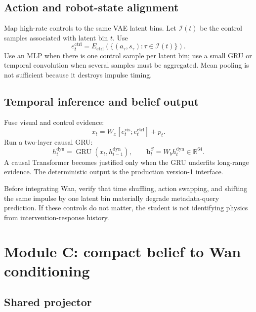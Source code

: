 \documentclass[11pt]{article}
\newcommand{\bvec}{\bm b}
\newcommand{\R}{\mathbb R}
\begin{document}
\subsection{Action and robot-state alignment}

Map high-rate controls to the same VAE latent bins.  Let $\mathcal I(t)$ be the
control samples associated with latent bin $t$.  Use
\begin{equation}
  e_t^{\mathrm{ctrl}}
  =E_{\mathrm{ctrl}}\!\left(
  \{(a_\tau,s_\tau):\tau\in\mathcal I(t)\}
  \right).
  \label{eq:control-encoder}
\end{equation}
Use an MLP when there is one control sample per latent bin; use a small GRU or
temporal convolution when several samples must be aggregated.  Mean pooling is
not sufficient because it destroys impulse timing.

\subsection{Temporal inference and belief output}

Fuse visual and control evidence:
\begin{equation}
  x_t=W_x[e_t^{\mathrm{vis}};e_t^{\mathrm{ctrl}}]+p_t.
\end{equation}
Run a two-layer causal GRU:
\begin{equation}
  h_t^{\mathrm{dyn}}=\operatorname{GRU}(x_t,h_{t-1}^{\mathrm{dyn}}),
  \qquad
  \bvec_t^S=W_b h_t^{\mathrm{dyn}}\in\R^{64}.
  \label{eq:student-belief}
\end{equation}
A causal Transformer becomes justified only when the GRU underfits long-range
evidence.  The deterministic output is the production version-1 interface.

\begin{gatebox}
Before integrating Wan, verify that time shuffling, action swapping, and
shifting the same impulse by one latent bin materially degrade metadata-query
prediction.  If these controls do not matter, the student is not identifying
physics from intervention-response history.
\end{gatebox}

\section{Module C: compact belief to Wan conditioning}

\subsection{Shared projector}
\end{document}
